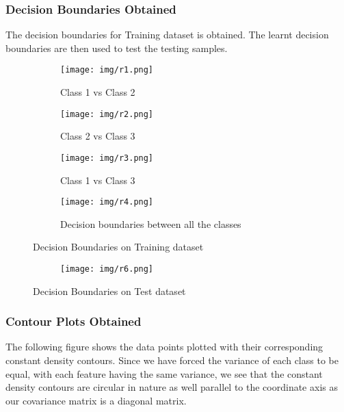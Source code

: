 \subsubsection{Decision Boundaries Obtained}
The decision boundaries for Training dataset is obtained. The learnt decision boundaries are then used to test the testing samples.\\
\begin{figure}
    \begin{subfigure}{0.49\textwidth}
        \texttt{[image: img/r1.png]}
        \caption{Class 1 vs Class 2 }
    \end{subfigure}%
    \hfill
    \begin{subfigure}{0.49\textwidth}
        \texttt{[image: img/r2.png]}
        \caption{Class 2 vs Class 3}
    \end{subfigure}
    
    \begin{subfigure}{0.49\textwidth}
        \texttt{[image: img/r3.png]}
        \caption{Class 1 vs Class 3}
    \end{subfigure}%
    \hfill
    \begin{subfigure}{0.49\textwidth}
        \texttt{[image: img/r4.png]}
        \caption{Decision boundaries between all the classes}
    \end{subfigure}
    \caption{Decision Boundaries on Training dataset}
    \label{fig:Figure6}
\end{figure}

\begin{figure}
\centering
    \begin{subfigure}{0.49\textwidth}
        \texttt{[image: img/r6.png]}
    \end{subfigure}
\caption{Decision Boundaries on Test dataset}
\label{fig:Figure7}
\end{figure}

\subsubsection{Contour Plots Obtained}
The following figure shows the data points plotted with their corresponding constant density contours. Since we have forced the variance of each class to be equal, with each feature having the same variance, we see that the constant density contours are circular in nature as well parallel to the coordinate axis as our covariance matrix is a diagonal matrix.\\

